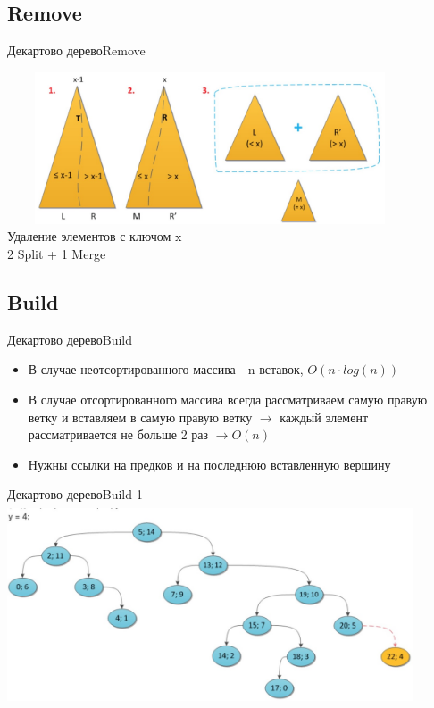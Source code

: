 \documentclass[10pt]{beamer}
\begin{document}
\subsection{Remove}
\begin{frame}[fragile]{Декартово дерево}{Remove}
\begin{center}
\includegraphics[width=12cm, height=4.5cm]{Term_1/Source/Pirctures/treap_remove.jpg}\\
Удаление элементов с ключом x\\
2 Split + 1 Merge
\end{center}
\end{frame}

\subsection{Build}
\begin{frame}[fragile]{Декартово дерево}{Build}
\begin{itemize}
    \item В случае неотсортированного массива - n вставок, $O(n\cdot log(n))$
    \item В случае отсортированного массива всегда рассматриваем самую правую ветку и вставляем в самую правую ветку $\rightarrow$ каждый элемент рассматривается не больше 2 раз $\rightarrow O(n)$ 
    \item Нужны ссылки на предков и на последнюю вставленную вершину
\end{itemize}
\end{frame}

\begin{frame}[fragile]{Декартово дерево}{Build-1}
\includegraphics[width=12cm, height=6cm]{Term_1/Source/Pirctures/treap_insert_4.jpg}\\
\end{frame}
\end{document}
